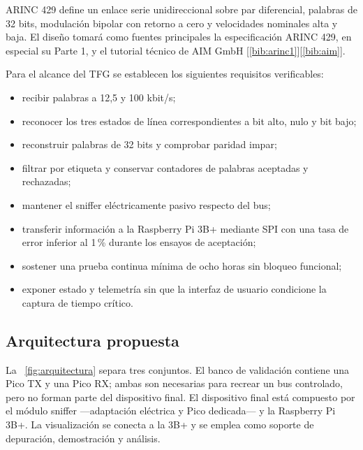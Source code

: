 \documentclass[12pt,a4paper,oneside]{article}
\newcommand{\citeref}[1]{[\ref{#1}]}
\begin{document}
ARINC 429 define un enlace serie unidireccional sobre par diferencial, palabras de 32 bits, modulación bipolar con retorno a cero y velocidades nominales alta y baja. El diseño tomará como fuentes principales la especificación ARINC 429, en especial su Parte 1, y el tutorial técnico de AIM GmbH \citeref{bib:arinc1}\citeref{bib:aim}.

Para el alcance del TFG se establecen los siguientes requisitos verificables:

\begin{itemize}
  \item recibir palabras a 12,5 y 100 kbit/s;
  \item reconocer los tres estados de línea correspondientes a bit alto, nulo y bit bajo;
  \item reconstruir palabras de 32 bits y comprobar paridad impar;
  \item filtrar por etiqueta y conservar contadores de palabras aceptadas y rechazadas;
  \item mantener el sniffer eléctricamente pasivo respecto del bus;
  \item transferir información a la Raspberry Pi 3B+ mediante SPI con una tasa de error inferior al 1\,\% durante los ensayos de aceptación;
  \item sostener una prueba continua mínima de ocho horas sin bloqueo funcional;
  \item exponer estado y telemetría sin que la interfaz de usuario condicione la captura de tiempo crítico.
\end{itemize}

\subsection{Arquitectura propuesta}

La \figurename~\ref{fig:arquitectura} separa tres conjuntos. El banco de validación contiene una Pico TX y una Pico RX; ambas son necesarias para recrear un bus controlado, pero no forman parte del dispositivo final. El dispositivo final está compuesto por el módulo sniffer ---adaptación eléctrica y Pico dedicada--- y la Raspberry Pi 3B+. La visualización se conecta a la 3B+ y se emplea como soporte de depuración, demostración y análisis.
\end{document}
